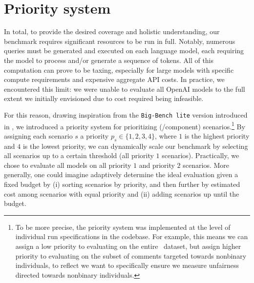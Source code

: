 \hypertarget{priorities}{\section{Priority system}}
\label{app:priorities}

In total, to provide the desired coverage and holistic understanding, our benchmark requires significant resources to be run in full.
Notably, numerous queries must be generated and executed on each language model, each requiring the model to process and/or generate a sequence of tokens.
All of this computation can prove to be taxing, especially for large models with specific compute requirements and expensive aggregate API costs.
In practice, we encountered this limit: we were unable to evaluate all OpenAI models to the full extent we initially envisioned due to cost required being infeasible. 

For this reason, drawing inspiration from the \texttt{Big-Bench lite} version introduced in \citet{srivastava2022bigbench}, we introduced a priority system for prioritizing (\core/component) scenarios.\footnote{To be more precise, the priority system was implemented at the level of individual run specifications in the codebase. For example, this means we can assign a low priority to evaluating on the entire \civilcomments~dataset, but assign higher priority to evaluating on the subset of comments targeted towards nonbinary individuals, to reflect we want to specifically ensure we measure unfairness directed towards nonbinary individuals.} 
By assigning each scenario $s$ a priority $p_s \in \{1, 2, 3, 4\}$, where $1$ is the highest priority and $4$ is the lowest priority, we can dynamically scale our benchmark by selecting all scenarios up to a certain threshold (\eg all priority $1$ scenarios). 
Practically, we chose to evaluate all models on all priority $1$ and priority $2$ scenarios.
More generally, one could imagine adaptively determine the ideal evaluation given a fixed budget by (i) sorting scenarios by priority, and then further by estimated cost among scenarios with equal priority and (ii) adding scenarios up until the budget.

